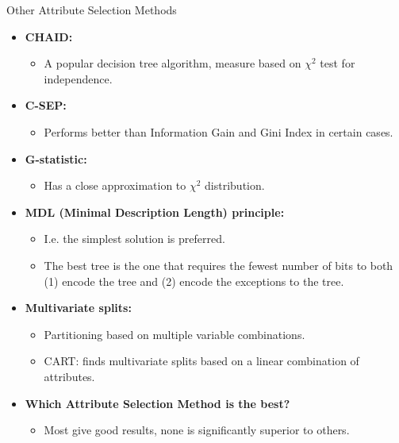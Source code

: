 \begin{frame}{Other Attribute Selection Methods}
	\begin{itemize}
		\item \textbf{CHAID:}
		      \begin{itemize}
			      \item A popular decision tree algorithm, measure based on $\chi^2$ test for independence.
		      \end{itemize}
		\item \textbf{C-SEP:}
		      \begin{itemize}
			      \item Performs better than Information Gain and Gini Index in certain cases.
		      \end{itemize}
		\item \textbf{G-statistic:}
		      \begin{itemize}
			      \item Has a close approximation to $\chi^2$ distribution.
		      \end{itemize}
		\item \textbf{MDL (Minimal Description Length) principle:}
		      \begin{itemize}
			      \item I.e. the simplest solution is preferred.
			      \item The best tree is the one that requires the fewest number of bits to both (1) encode the tree and (2) encode the exceptions to the tree.
		      \end{itemize}
		\item \textbf{Multivariate splits:}
		      \begin{itemize}
			      \item Partitioning based on multiple variable combinations.
			      \item CART: finds multivariate splits based on a linear combination of attributes.
		      \end{itemize}
		\item \textbf{Which Attribute Selection Method is the best?}
		      \begin{itemize}
			      \item Most give good results, none is significantly superior to others.
		      \end{itemize}
	\end{itemize}
\end{frame}


